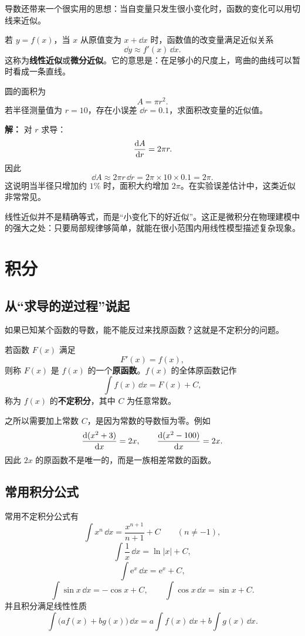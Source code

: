 导数还带来一个很实用的思想：当自变量只发生很小变化时，函数的变化可以用切线来近似。

若 $y=f(x)$，当 $x$ 从原值变为 $x+\dd x$ 时，函数值的改变量满足近似关系
\[
  \dd y \approx f'(x)\,\dd x.
\]
这称为\textbf{线性近似}或\textbf{微分近似}。它的意思是：在足够小的尺度上，弯曲的曲线可以暂时看成一条直线。

\begin{example}
圆的面积为
\[
  A=\pi r^2.
\]
若半径测量值为 $r=10$，存在小误差 $\dd r=0.1$，求面积改变量的近似值。

\textbf{解：} 对 $r$ 求导：
\[
  \dv{A}{r}=2\pi r.
\]
因此
\[
  \dd A \approx 2\pi r\,\dd r = 2\pi \times 10 \times 0.1 = 2\pi.
\]
这说明当半径只增加约 $1\%$ 时，面积大约增加 $2\pi$。在实验误差估计中，这类近似非常常见。
\end{example}

\begin{remark}
线性近似并不是精确等式，而是“小变化下的好近似”。这正是微积分在物理建模中的强大之处：只要局部规律够简单，就能在很小范围内用线性模型描述复杂现象。
\end{remark}

\section{积分}

\subsection{从“求导的逆过程”说起}

如果已知某个函数的导数，能不能反过来找原函数？这就是不定积分的问题。

\begin{definition}
若函数 $F(x)$ 满足
\[
  F'(x) = f(x),
\]
则称 $F(x)$ 是 $f(x)$ 的一个\textbf{原函数}。$f(x)$ 的全体原函数记作
\[
  \int f(x)\,\dd x = F(x) + C,
\]
称为 $f(x)$ 的\textbf{不定积分}，其中 $C$ 为任意常数。
\end{definition}

之所以需要加上常数 $C$，是因为常数的导数恒为零。例如
\[
  \dv{(x^2+3)}{x}=2x, \qquad \dv{(x^2-100)}{x}=2x.
\]
因此 $2x$ 的原函数不是唯一的，而是一族相差常数的函数。

\subsection{常用积分公式}

\begin{theorem}
常用不定积分公式有
\[
  \int x^n\,\dd x = \frac{x^{n+1}}{n+1}+C \qquad (n\ne -1),
\]
\[
  \int \frac{1}{x}\,\dd x = \ln|x| + C,
\]
\[
  \int \mathrm{e}^x\,\dd x = \mathrm{e}^x + C,
\]
\[
  \int \sin x\,\dd x = -\cos x + C,
  \qquad
  \int \cos x\,\dd x = \sin x + C.
\]
并且积分满足线性性质
\[
  \int \bigl(af(x)+bg(x)\bigr)\,\dd x
  = a\int f(x)\,\dd x + b\int g(x)\,\dd x.
\]
\end{theorem}

